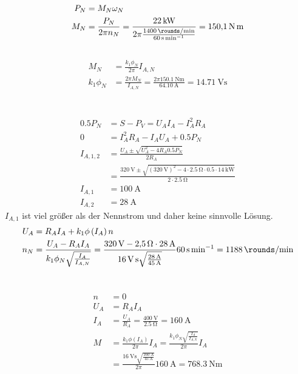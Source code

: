 \documentclass[11pt,a4paper]{scrartcl}
\newcommand{\mybr}[1]{\left(#1\right)}
\newcommand{\0}{_{\mybr{0}}}
\newcommand{\1}{_{\mybr{1}}}
\newcommand{\2}{_{\mybr{2}}}
\begin{document}
\subsection{}
\begin{align}
P_N&=M_N \omega_N\\
M_N&=\frac{P_N}{2\pi n_N}=\frac{\SI{22}{\kilo\watt}}{2\pi\frac{\SI{1400}{\rounds\per\minute}}{\SI{60}{\second\per\minute}}}=\SI{150.1}{\newton\metre}
\end{align}

\subsection{}
\begin{align}
M_N&=\frac{k_1\phi_N}{2\pi}I_{A,N}\\
k_1\phi_N&=\frac{2\pi M_N}{I_{A,N}}=\frac{2\pi \SI{150.1}{\newton\metre}}{\SI{64.10}{\ampere}}=\SI{14.71}{\volt\second}
\end{align}

\section{}
\begin{align}
\num{0.5}P_N&=S-P_V=U_A I_A - I_A^2 R_A\\
0&=I_A^2 R_A - I_A U_A + \num{0.5}P_N\\
I_{A,1,2}&=\frac{U_A\pm\sqrt{U_A^2-4 R_A \num{0.5}P_N}}{2 R_A}\\
&=\frac{\SI{320}{\volt}\pm\sqrt{\mybr{\SI{320}{\volt}}^2-4 \cdot \SI{2.5}{\ohm}\cdot \num{0.5}\cdot\SI{14}{\kilo\watt}}}{2 \cdot \SI{2.5}{\ohm}}\\
I_{A,1}&=\SI{100}{\ampere}\\
I_{A,2}&=\SI{28}{\ampere}
\end{align}
$I_{A,1}$ ist viel größer als der Nennstrom und daher keine sinnvolle Lösung.
\begin{align}
U_A&=R_A I_A + k_1\phi\mybr{I_A} n\\
n_N&=\frac{U_A-R_A I_A}{k_1\phi_N\sqrt{\frac{I_A}{I_{A,N}}}}=\frac{\SI{320}{\volt}-\SI{2.5}{\ohm}\cdot\SI{28}{\ampere}}{\SI{16}{\volt\second}\sqrt{\frac{\SI{28}{\ampere}}{\SI{45}{\ampere}}}}\SI{60}{\second\per\minute}=\SI{1188}{\rounds\per\minute}
\end{align}

\section{}
\subsection{}
\begin{align}
n&=0\\
U_A&=R_A I_A\\
I_A&=\frac{U_A}{R_A}=\frac{\SI{400}{\volt}}{\SI{2.5}{\ohm}}=\SI{160}{\ampere}\\
M&=\frac{k_1\phi\mybr{I_A}}{2\pi}I_A=\frac{k_1\phi_N\sqrt{\frac{I_A}{I_{A,N}}}}{2\pi}I_A\\
&=\frac{\SI{16}{\volt\second}\sqrt{\frac{\SI{160}{\ampere}}{\SI{45}{\ampere}}}}{2\pi}\SI{160}{\ampere}=\SI{768.3}{\newton\metre}
\end{align}
\end{document}

